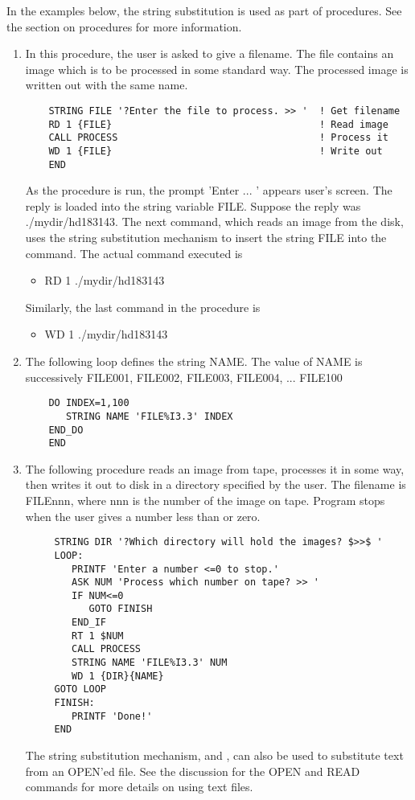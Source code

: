 In the examples below, the string substitution is used as part of
procedures.  See the section on procedures for more information.
\begin{enumerate}
  \item{In this procedure, the user is asked to give a filename.  The file
       contains an image which is to be processed in some standard way.
       The processed image is written out with the same name.
  \begin{verbatim}
    STRING FILE '?Enter the file to process. >> '  ! Get filename
    RD 1 {FILE}                                    ! Read image
    CALL PROCESS                                   ! Process it
    WD 1 {FILE}                                    ! Write out
    END
  \end{verbatim}
  As the procedure is run, the prompt 'Enter ... ' appears user's screen.
  The reply is loaded into the string variable FILE.  Suppose the reply was
  ./mydir/hd183143.  The next command, which reads an image from the disk,
  uses the string substitution mechanism to insert the string FILE into the
  command.  The actual command executed is
  \begin{itemize}
    \item{RD 1 ./mydir/hd183143}
  \end{itemize}
  Similarly, the last command in the procedure is
  \begin{itemize}
    \item{WD 1 ./mydir/hd183143}
  \end{itemize}
}

  \item{The following loop defines the string NAME.  The value of NAME
      is successively FILE001, FILE002, FILE003, FILE004, ... FILE100
  \begin{verbatim}
    DO INDEX=1,100
       STRING NAME 'FILE%I3.3' INDEX
    END_DO
    END
  \end{verbatim}
  }

  \item{The following procedure reads an image from tape, processes it in
        some way, then writes it out to disk in a directory specified by
        the user.  The filename is FILEnnn, where nnn is the number of the
        image on tape.  Program stops when the user gives a number less
        than or zero.
  \begin{verbatim}
     STRING DIR '?Which directory will hold the images? $>>$ ' 
     LOOP:
        PRINTF 'Enter a number <=0 to stop.'
        ASK NUM 'Process which number on tape? >> '
        IF NUM<=0
           GOTO FINISH
        END_IF
        RT 1 $NUM
        CALL PROCESS
        STRING NAME 'FILE%I3.3' NUM
        WD 1 {DIR}{NAME}
     GOTO LOOP
     FINISH:
        PRINTF 'Done!'
     END
  \end{verbatim}
  The string substitution mechanism, { and }, can also be used to
  substitute text from an OPEN'ed file.  See the discussion for the OPEN
  and READ commands for more details on using text files.  }
\end{enumerate}


